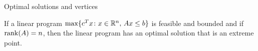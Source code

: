 \begin{frame}{Optimal solutions and vertices}


\begin{theorem}
  \label{thr:2}
  If a linear program $\max\{c^Tx \colon x \in \mathbb{R}^n, \, Ax \leq b\}$
  is feasible and bounded and if $\operatorname{\mathrm{rank}}(A) = n$, then the linear program has an optimal solution that is  an extreme point. 
\end{theorem}


  
  \begin{columns}
    \begin{column}{.5\textwidth}
      
    \end{column}
    \begin{column}{.5\textwidth}
      
    \end{column}       
  \end{columns}
\end{frame}







\begin{frame}{}

  \begin{columns}
    \begin{column}{.5\textwidth}
      
    \end{column}
    \begin{column}{.5\textwidth}
      
    \end{column}       
  \end{columns}
\end{frame}




\begin{frame}{}  
  \begin{columns}
    \begin{column}{.5\textwidth}
      
    \end{column}
    \begin{column}{.5\textwidth}
      
    \end{column}       
  \end{columns}
\end{frame}



